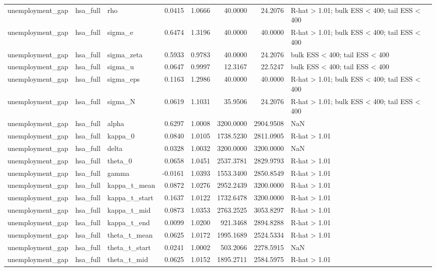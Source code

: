 \begin{tabular}{lllrrrrl}
unemployment\_gap & hsa\_full & rho & 0.0415 & 1.0666 & 40.0000 & 24.2076 & R-hat > 1.01; bulk ESS < 400; tail ESS < 400 \\
unemployment\_gap & hsa\_full & sigma\_e & 0.6474 & 1.3196 & 40.0000 & 40.0000 & R-hat > 1.01; bulk ESS < 400; tail ESS < 400 \\
unemployment\_gap & hsa\_full & sigma\_zeta & 0.5933 & 0.9783 & 40.0000 & 24.2076 & bulk ESS < 400; tail ESS < 400 \\
unemployment\_gap & hsa\_full & sigma\_u & 0.0647 & 0.9997 & 12.3167 & 22.5247 & bulk ESS < 400; tail ESS < 400 \\
unemployment\_gap & hsa\_full & sigma\_eps & 0.1163 & 1.2986 & 40.0000 & 40.0000 & R-hat > 1.01; bulk ESS < 400; tail ESS < 400 \\
unemployment\_gap & hsa\_full & sigma\_N & 0.0619 & 1.1031 & 35.9506 & 24.2076 & R-hat > 1.01; bulk ESS < 400; tail ESS < 400 \\
unemployment\_gap & hsa\_full & alpha & 0.6297 & 1.0008 & 3200.0000 & 2904.9508 & NaN \\
unemployment\_gap & hsa\_full & kappa\_0 & 0.0840 & 1.0105 & 1738.5230 & 2811.0905 & R-hat > 1.01 \\
unemployment\_gap & hsa\_full & delta & 0.0328 & 1.0032 & 3200.0000 & 3200.0000 & NaN \\
unemployment\_gap & hsa\_full & theta\_0 & 0.0658 & 1.0451 & 2537.3781 & 2829.9793 & R-hat > 1.01 \\
unemployment\_gap & hsa\_full & gamma & -0.0161 & 1.0393 & 1553.3400 & 2850.8549 & R-hat > 1.01 \\
unemployment\_gap & hsa\_full & kappa\_t\_mean & 0.0872 & 1.0276 & 2952.2439 & 3200.0000 & R-hat > 1.01 \\
unemployment\_gap & hsa\_full & kappa\_t\_start & 0.1637 & 1.0122 & 1732.6478 & 3200.0000 & R-hat > 1.01 \\
unemployment\_gap & hsa\_full & kappa\_t\_mid & 0.0873 & 1.0353 & 2763.2525 & 3053.8297 & R-hat > 1.01 \\
unemployment\_gap & hsa\_full & kappa\_t\_end & 0.0099 & 1.0200 & 921.3468 & 2894.8288 & R-hat > 1.01 \\
unemployment\_gap & hsa\_full & theta\_t\_mean & 0.0625 & 1.0172 & 1995.1689 & 2524.5334 & R-hat > 1.01 \\
unemployment\_gap & hsa\_full & theta\_t\_start & 0.0241 & 1.0002 & 503.2066 & 2278.5915 & NaN \\
unemployment\_gap & hsa\_full & theta\_t\_mid & 0.0625 & 1.0152 & 1895.2711 & 2584.5975 & R-hat > 1.01 \\

\end{tabular}
